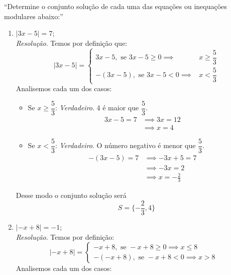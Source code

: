 \enquote{Determine o conjunto solução de cada uma das equações ou inequações modulares abaixo:}
\begin{enumerate}
    \item $|3x - 5| = 7$;
    \\ \emph{Resolução}. Temos por definição que:
    \begin{displaymath}
        |3x - 5| = \left\{\begin{array}{cc}
             3x-5, \text{ se } 3x-5 \ge 0 \implies & x \ge \dfrac{5}{3} \\
             -(3x-5), \text{ se } 3x-5 < 0 \implies & x < \dfrac{5}{3}
        \end{array}
        \right.
    \end{displaymath}
    Analisemos cada um dos casos:
    \begin{itemize}
        \item Se $x \ge \dfrac{5}{3}$: \emph{Verdadeiro}. 4 é maior que $\dfrac{5}{3}$.
        \begin{align*}
            3x - 5  = 7 & \implies 3x = 12 \\ & \implies x = 4 
        \end{align*}
        \item Se $x < \dfrac{5}{3}$: \emph{Verdadeiro}. O número negativo é menor que $\dfrac{5}{3}$.
        \begin{align*}
            -(3x - 5) = 7 & \implies -3x + 5 = 7 \\ & \implies -3x = 2 \\ & \implies
            x = -\frac{2}{3}
        \end{align*}
    \end{itemize}
    Desse modo o conjunto solução será
    \begin{displaymath}
        S = \{ -\dfrac{2}{3}, 4 \}
    \end{displaymath}
    \item $|-x + 8| = -1$;
    \\ \emph{Resolução}. Temos por definição:
    \begin{displaymath}
        |-x + 8| = \left\{\begin{array}{cc}
             -x + 8, \text{ se } -x + 8 \ge 0 \implies x \le 8&  \\
             -(-x + 8), \text{ se } -x + 8 < 0 \implies x > 8& 
        \end{array} 
        \right.
    \end{displaymath}
    Analisemos cada um dos casos:
    \begin{itemize}

\end{itemize}
\end{enumerate}
